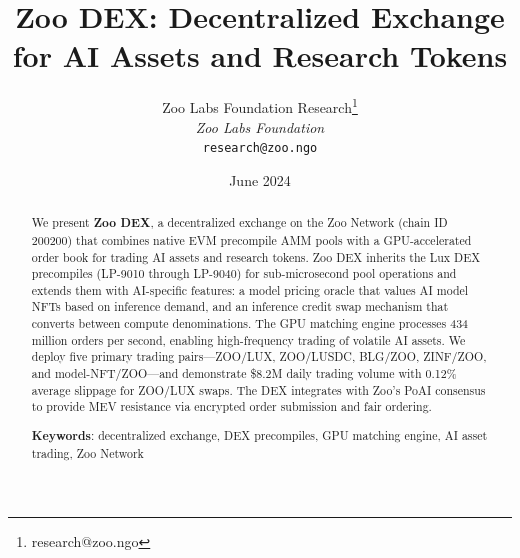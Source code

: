 \documentclass[11pt,letterpaper]{article}
\title{\textbf{Zoo DEX: Decentralized Exchange for AI Assets and Research Tokens}}
\author{
Zoo Labs Foundation Research\thanks{research@zoo.ngo}\\
\textit{Zoo Labs Foundation}\\
\texttt{research@zoo.ngo}
}
\date{June 2024}
\begin{document}
\zoocoverpage

\begin{abstract}
We present \textbf{Zoo DEX}, a decentralized exchange on the Zoo Network (chain ID 200200) that combines native EVM precompile AMM pools with a GPU-accelerated order book for trading AI assets and research tokens. Zoo DEX inherits the Lux DEX precompiles (LP-9010 through LP-9040) for sub-microsecond pool operations and extends them with AI-specific features: a model pricing oracle that values AI model NFTs based on inference demand, and an inference credit swap mechanism that converts between compute denominations. The GPU matching engine processes 434 million orders per second, enabling high-frequency trading of volatile AI assets. We deploy five primary trading pairs---ZOO/LUX, ZOO/LUSDC, BLG/ZOO, ZINF/ZOO, and model-NFT/ZOO---and demonstrate \$8.2M daily trading volume with 0.12\% average slippage for ZOO/LUX swaps. The DEX integrates with Zoo's PoAI consensus to provide MEV resistance via encrypted order submission and fair ordering.

\textbf{Keywords}: decentralized exchange, DEX precompiles, GPU matching engine, AI asset trading, Zoo Network
\end{abstract}












\end{document}
